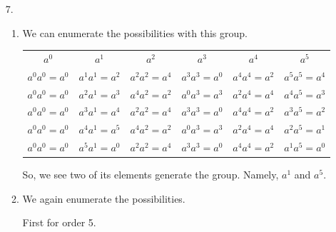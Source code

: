 \documentclass[12pt,letterpaper]{article}
\begin{document}
\begin{enumerate}
\begin{enumerate}
\begin{itemize}
\begin{proof}
                Since $a$ is a real number there exists $\frac{1}{a} \in H$.

                $a \times \frac{1}{a} = 1 = \frac{1}{a} \times a$.

                So we have shown that inverses exist.
              \end{proof}
          \end{itemize}

          From these three we have shown that $H$ is a subgroup of $G$.
        \item[(e)]
          $H$ is not a subgroup of $G$ as $H \not \subseteq G$ since every element of $H$ is not invertible.
      \end{enumerate}

    \item[7.]
      \begin{enumerate}
        \item
          We can enumerate the possibilities with this group.

          \begin{tabular}{| c | c | c | c | c | c |}
            \hline
            $a^0$          & $a^1$          & $a^2$          & $a^3$          & $a^4$          & $a^5$          \\
            $a^0a^0 = a^0$ & $a^1a^1 = a^2$ & $a^2a^2 = a^4$ & $a^3a^3 = a^0$ & $a^4a^4 = a^2$ & $a^5a^5 = a^4$ \\
            $a^0a^0 = a^0$ & $a^2a^1 = a^3$ & $a^4a^2 = a^2$ & $a^0a^3 = a^3$ & $a^2a^4 = a^4$ & $a^4a^5 = a^3$ \\
            $a^0a^0 = a^0$ & $a^3a^1 = a^4$ & $a^2a^2 = a^4$ & $a^3a^3 = a^0$ & $a^4a^4 = a^2$ & $a^3a^5 = a^2$ \\
            $a^0a^0 = a^0$ & $a^4a^1 = a^5$ & $a^4a^2 = a^2$ & $a^0a^3 = a^3$ & $a^2a^4 = a^4$ & $a^2a^5 = a^1$ \\
            $a^0a^0 = a^0$ & $a^5a^1 = a^0$ & $a^2a^2 = a^4$ & $a^3a^3 = a^0$ & $a^4a^4 = a^2$ & $a^1a^5 = a^0$ \\
            \hline
          \end{tabular}

          So, we see two of its elements generate the group.
          Namely, $a^1$ and $a^5$.

        \item
          We again enumerate the possibilities.

          First for order 5.


\end{enumerate}
\end{enumerate}
\end{document}

